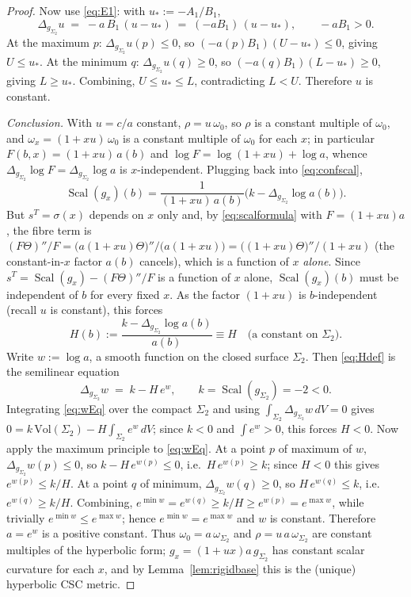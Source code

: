 \documentclass{amsart}
\theoremstyle{definition}
\DeclareMathOperator{\Scal}{Scal}
\begin{document}
\begin{proof}
Now use \eqref{eq:E1}: with $u_\ast:=-A_1/B_1$,
\[
  \Delta_{g_{\Sigma_2}}u \;=\; -a\,B_1\,(u-u_\ast)\;=\;(-aB_1)\,(u-u_\ast),
  \qquad -aB_1>0 .
\]
At the maximum $p$: $\Delta_{g_{\Sigma_2}}u(p)\le0$, so $(-a(p)B_1)(U-u_\ast)\le0$,
giving $U\le u_\ast$. At the minimum $q$: $\Delta_{g_{\Sigma_2}}u(q)\ge0$, so
$(-a(q)B_1)(L-u_\ast)\ge0$, giving $L\ge u_\ast$. Combining, $U\le u_\ast\le L$,
contradicting $L<U$. Therefore $u$ is constant.

\emph{Conclusion.} With $u=c/a$ constant, $\rho=u\,\omega_0$, so $\rho$ is a
constant multiple of $\omega_0$, and $\omega_x=(1+xu)\,\omega_0$ is a constant
multiple of $\omega_0$ for each $x$; in particular $F(b,x)=(1+xu)\,a(b)$ and
$\log F=\log(1+xu)+\log a$, whence $\Delta_{g_{\Sigma_2}}\log F
=\Delta_{g_{\Sigma_2}}\log a$ is $x$-independent. Plugging back into
\eqref{eq:confscal},
\[
  \Scal(g_x)(b)=\frac{1}{(1+xu)\,a(b)}\bigl(k-\Delta_{g_{\Sigma_2}}\log a(b)\bigr).
\]
But $s^T=\sigma(x)$ depends on $x$ only and, by \eqref{eq:scalformula} with
$F=(1+xu)a$, the fibre term is
$(F\Theta)''/F=\bigl(a(1+xu)\Theta\bigr)''/\bigl(a(1+xu)\bigr)
=\bigl((1+xu)\Theta\bigr)''/(1+xu)$ (the constant-in-$x$ factor $a(b)$ cancels),
which is a function of $x$ \emph{alone}. Since $s^T=\Scal(g_x)-(F\Theta)''/F$ is a
function of $x$ alone, $\Scal(g_x)(b)$ must be independent of $b$ for every
fixed $x$. As the factor $(1+xu)$ is $b$-independent (recall $u$ is constant),
this forces
\begin{equation}\label{eq:Hdef}
  H(b):=\frac{k-\Delta_{g_{\Sigma_2}}\log a(b)}{a(b)}\equiv H\quad\text{(a constant on }\Sigma_2).
\end{equation}
Write $w:=\log a$, a smooth function on the closed surface $\Sigma_2$. Then
\eqref{eq:Hdef} is the semilinear equation
\begin{equation}\label{eq:wEq}
  \Delta_{g_{\Sigma_2}}w \;=\; k-H\,e^{w},\qquad k=\Scal(g_{\Sigma_2})=-2<0 .
\end{equation}
Integrating \eqref{eq:wEq} over the compact $\Sigma_2$ and using
$\int_{\Sigma_2}\Delta_{g_{\Sigma_2}}w\,dV=0$ gives
$0=k\,\mathrm{Vol}(\Sigma_2)-H\int_{\Sigma_2}e^{w}\,dV$; since $k<0$ and
$\int e^{w}>0$, this forces $H<0$. Now apply the maximum principle to
\eqref{eq:wEq}. At a point $p$ of maximum of $w$,
$\Delta_{g_{\Sigma_2}}w(p)\le0$, so $k-H\,e^{w(p)}\le0$, i.e.\
$H\,e^{w(p)}\ge k$; since $H<0$ this gives $e^{w(p)}\le k/H$. At a point $q$ of
minimum, $\Delta_{g_{\Sigma_2}}w(q)\ge0$, so $H\,e^{w(q)}\le k$, i.e.\
$e^{w(q)}\ge k/H$. Combining, $e^{\min w}=e^{w(q)}\ge k/H\ge e^{w(p)}=e^{\max
w}$, while trivially $e^{\min w}\le e^{\max w}$; hence $e^{\min w}=e^{\max w}$
and $w$ is constant. Therefore $a=e^{w}$ is a positive constant. Thus
$\omega_0=a\,\omega_{\Sigma_2}$ and $\rho=u\,a\,\omega_{\Sigma_2}$ are constant
multiples of the hyperbolic form; $g_x=(1+ux)a\,g_{\Sigma_2}$ has constant
scalar curvature for each $x$, and by Lemma~\ref{lem:rigidbase} this is the
(unique) hyperbolic CSC metric.


\end{proof}
\end{document}
